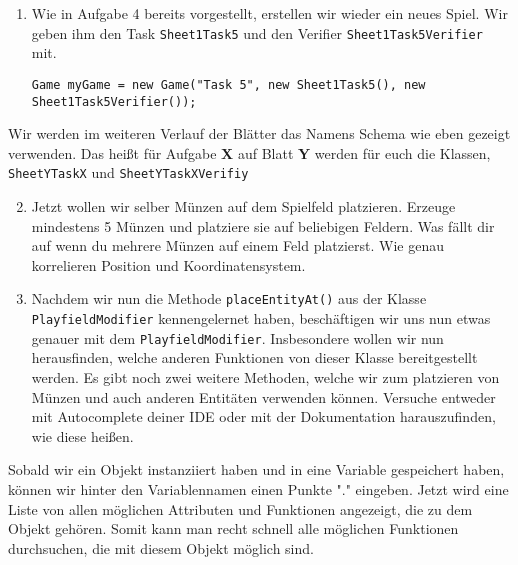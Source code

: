 

\begin{enumerate}[label=\alph*)]
    \item Wie in Aufgabe 4 bereits vorgestellt, erstellen wir wieder ein neues Spiel. Wir geben ihm den Task \texttt{Sheet1Task5} und den Verifier \texttt{Sheet1Task5Verifier} mit.

    \begin{lstlisting}
Game myGame = new Game("Task 5", new Sheet1Task5(), new Sheet1Task5Verifier());
    \end{lstlisting}
\end{enumerate}

\begin{Infobox}
    Wir werden im weiteren Verlauf der Blätter das Namens Schema wie eben gezeigt verwenden. Das heißt für Aufgabe \textbf{X} auf Blatt \textbf{Y} werden für euch die Klassen, \texttt{SheetYTaskX} und \texttt{SheetYTaskXVerifiy}
\end{Infobox}

\begin{enumerate}[label=\alph*)] \setcounter{enumi}{1}
    \item Jetzt wollen wir selber Münzen auf dem Spielfeld platzieren. Erzeuge mindestens 5 Münzen und platziere sie auf beliebigen Feldern. Was fällt dir auf wenn du mehrere Münzen auf einem Feld platzierst. Wie genau korrelieren Position und Koordinatensystem.

    \item Nachdem wir nun die Methode \texttt{placeEntityAt()} aus der Klasse \texttt{PlayfieldModifier} kennengelernet haben, beschäftigen wir uns nun etwas genauer mit dem \texttt{PlayfieldModifier}. Insbesondere wollen wir nun herausfinden, welche anderen Funktionen von dieser Klasse bereitgestellt werden. Es gibt noch zwei weitere Methoden, welche wir zum platzieren von Münzen und auch anderen Entitäten verwenden können. Versuche entweder mit Autocomplete deiner IDE oder mit der Dokumentation harauszufinden, wie diese heißen.
\end{enumerate}

\begin{Infobox}[Autocompletion]
    Sobald wir ein Objekt instanziiert haben und in eine Variable gespeichert haben, können wir hinter den Variablennamen einen Punkte "." eingeben. Jetzt wird eine Liste von allen möglichen Attributen und Funktionen angezeigt, die zu dem Objekt gehören. Somit kann man recht schnell alle möglichen Funktionen durchsuchen, die mit diesem Objekt möglich sind.
\end{Infobox}

